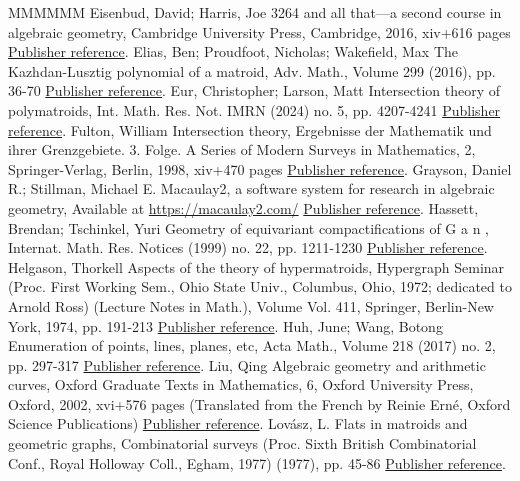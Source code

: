 \begin{thebibliography}{MMMMMM}
 Eisenbud, David; Harris, Joe 3264 and all that—a second course in algebraic geometry, Cambridge University Press, Cambridge, 2016, xiv+616 pages \href{https://alco.centre-mersenne.org/articles/10.5802/alco.447/#EH16}{Publisher reference}.
 Elias, Ben; Proudfoot, Nicholas; Wakefield, Max The Kazhdan-Lusztig polynomial of a matroid, Adv. Math., Volume 299 (2016), pp. 36-70 \href{https://alco.centre-mersenne.org/articles/10.5802/alco.447/#KLpoly}{Publisher reference}.
 Eur, Christopher; Larson, Matt Intersection theory of polymatroids, Int. Math. Res. Not. IMRN (2024) no. 5, pp. 4207-4241 \href{https://alco.centre-mersenne.org/articles/10.5802/alco.447/#EL23}{Publisher reference}.
 Fulton, William Intersection theory, Ergebnisse der Mathematik und ihrer Grenzgebiete. 3. Folge. A Series of Modern Surveys in Mathematics, 2, Springer-Verlag, Berlin, 1998, xiv+470 pages \href{https://alco.centre-mersenne.org/articles/10.5802/alco.447/#F98}{Publisher reference}.
 Grayson, Daniel R.; Stillman, Michael E. Macaulay2, a software system for research in algebraic geometry, Available at \url{https://macaulay2.com/} \href{https://alco.centre-mersenne.org/articles/10.5802/alco.447/#M2}{Publisher reference}.
 Hassett, Brendan; Tschinkel, Yuri Geometry of equivariant compactifications of G a n , Internat. Math. Res. Notices (1999) no. 22, pp. 1211-1230 \href{https://alco.centre-mersenne.org/articles/10.5802/alco.447/#HT99}{Publisher reference}.
 Helgason, Thorkell Aspects of the theory of hypermatroids, Hypergraph Seminar (Proc. First Working Sem., Ohio State Univ., Columbus, Ohio, 1972; dedicated to Arnold Ross) (Lecture Notes in Math.), Volume Vol. 411, Springer, Berlin-New York, 1974, pp. 191-213 \href{https://alco.centre-mersenne.org/articles/10.5802/alco.447/#H72}{Publisher reference}.
 Huh, June; Wang, Botong Enumeration of points, lines, planes, etc, Acta Math., Volume 218 (2017) no. 2, pp. 297-317 \href{https://alco.centre-mersenne.org/articles/10.5802/alco.447/#HW17}{Publisher reference}.
 Liu, Qing Algebraic geometry and arithmetic curves, Oxford Graduate Texts in Mathematics, 6, Oxford University Press, Oxford, 2002, xvi+576 pages (Translated from the French by Reinie Erné, Oxford Science Publications) \href{https://alco.centre-mersenne.org/articles/10.5802/alco.447/#liu}{Publisher reference}.
 Lovász, L. Flats in matroids and geometric graphs, Combinatorial surveys (Proc. Sixth British Combinatorial Conf., Royal Holloway Coll., Egham, 1977) (1977), pp. 45-86 \href{https://alco.centre-mersenne.org/articles/10.5802/alco.447/#L77}{Publisher reference}.

\end{thebibliography}
